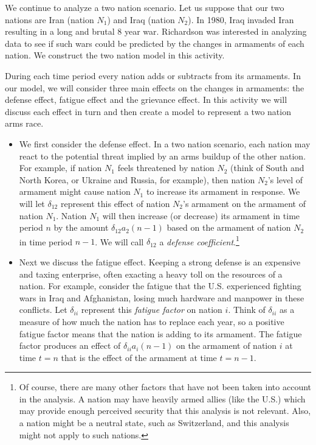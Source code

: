\begin{pactivity} \label{act:arms_race_1}  We continue to analyze a two nation scenario. Let us suppose that our two nations are Iran (nation $N_1$) and Iraq (nation $N_2$). In 1980, Iraq invaded Iran resulting in a long and brutal 8 year war. Richardson was interested in analyzing data to see if such wars could be predicted by the changes in armaments of each nation. We construct the two nation model in this activity. 
	
During each time period every nation adds or subtracts from its armaments. In our model, we will consider three main effects on the changes in armaments: the defense effect, fatigue effect and the grievance effect. In this activity we will discuss each effect in turn and then create a model to represent a two nation arms race. 
	
\begin{itemize}
\item We first consider the defense effect. In a two nation scenario, each nation may react to the potential threat implied by an arms buildup of the other nation. For example, if nation $N_1$ feels threatened by nation $N_2$ (think of South and North Korea, or Ukraine and Russia, for example), then nation $N_2$'s level of armament might cause nation $N_1$ to increase its armament in response. We will let $\delta_{12}$ represent this effect of nation $N_2$'s armament on the armament of nation $N_1$. Nation $N_1$ will then increase (or decrease) its armament in time period $n$ by the amount $\delta_{12}a_2(n-1)$ based on the armament of nation $N_2$ in time period $n-1$. We will call $\delta_{12}$ a \emph{defense coefficient}.\footnote{Of course, there are many other factors that have not been taken into account in the analysis. A nation may have heavily armed allies (like the U.S.) which may provide enough perceived security that this analysis is not relevant. Also, a nation might be a neutral state, such as Switzerland, and this analysis might not apply to such nations.}


\item Next we discuss the fatigue effect. Keeping a strong defense is an expensive and taxing enterprise, often exacting a heavy toll on the resources of a nation. For example, consider the fatigue that the U.S. experienced fighting wars in Iraq and Afghanistan, losing much hardware and manpower in these conflicts. Let $\delta_{ii}$ represent this \emph{fatigue factor} on nation $i$. Think of $\delta_{ii}$ as a measure of how much the nation has to replace each year, so a positive fatigue factor means that the nation is adding to its armament. The fatigue factor produces an effect of $\delta_{ii}a_i(n-1)$ on the armament of nation $i$ at time $t=n$ that is the effect of the armament at time $t=n-1$. 



\end{itemize}
\end{pactivity}
